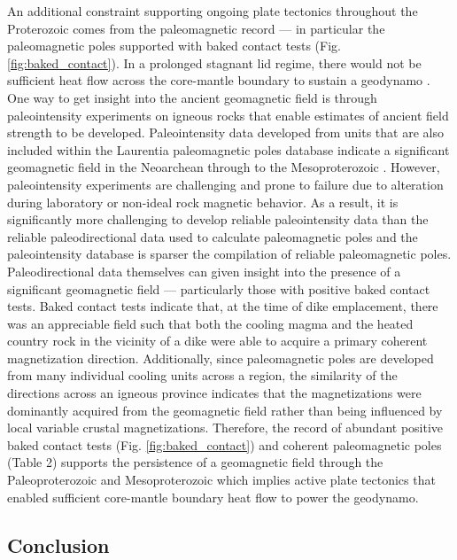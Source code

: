 \documentclass[twocolumn, switch]{article} %
\begin{document}
An additional constraint supporting ongoing plate tectonics throughout the Proterozoic comes from the paleomagnetic record --- in particular the paleomagnetic poles supported with baked contact tests (Fig. \ref{fig:baked_contact}). In a prolonged stagnant lid regime, there would not be sufficient heat flow across the core-mantle boundary to sustain a geodynamo \citep{Nimmo2000a, Buffett2000b}. One way to get insight into the ancient geomagnetic field is through paleointensity experiments on igneous rocks that enable estimates of ancient field strength to be developed.  Paleointensity data developed from units that are also included within the Laurentia paleomagnetic poles database indicate a significant geomagnetic field in the Neoarchean \citep{Selkin2000a} through to the Mesoproterozoic \citep{Macouin2006a, Sprain2018a}. However, paleointensity experiments are challenging and prone to failure due to alteration during laboratory or non-ideal rock magnetic behavior. As a result, it is significantly more challenging to develop reliable paleointensity data than the reliable paleodirectional data used to calculate paleomagnetic poles and the paleointensity database is sparser the compilation of reliable paleomagnetic poles. Paleodirectional data themselves can given insight into the presence of a significant geomagnetic field --- particularly those with positive baked contact tests. Baked contact tests indicate that, at the time of dike emplacement, there was an appreciable field such that both the cooling magma and the heated country rock in the vicinity of a dike were able to acquire a primary coherent magnetization direction. Additionally, since paleomagnetic poles are developed from many individual cooling units across a region, the similarity of the directions across an igneous province indicates that the magnetizations were dominantly acquired from the geomagnetic field rather than being influenced by local variable crustal magnetizations.  Therefore, the record of abundant positive baked contact tests (Fig. \ref{fig:baked_contact}) and coherent paleomagnetic poles (Table 2) supports the persistence of a geomagnetic field through the Paleoproterozoic and Mesoproterozoic which implies active plate tectonics that enabled sufficient core-mantle boundary heat flow to power the geodynamo.

\subsection{Conclusion}
\end{document}
